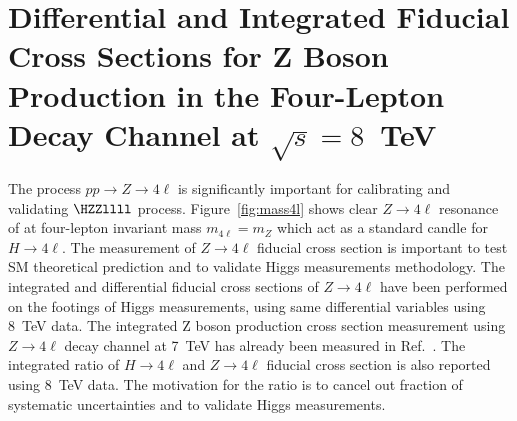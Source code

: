 \chapter{Differential and Integrated Fiducial Cross Sections for Z Boson Production in the Four-Lepton Decay Channel at $\sqrt{s} = 8$~TeV} \label{Chapter5} 
 The process $pp \rightarrow Z \rightarrow 4\ell$ is significantly important for calibrating and validating $\HZZllll$ process. 
 Figure~\ref{fig:mass4l} shows clear $Z \rightarrow 4\ell$ resonance of at four-lepton invariant mass $m_{4\ell} = m_Z$ which act as a standard
 candle for $H \rightarrow 4\ell$. The measurement of $Z \rightarrow 4\ell$ fiducial cross section is important to test SM theoretical prediction
 and to validate Higgs measurements methodology. The integrated and differential fiducial cross sections of $Z \rightarrow 4\ell$ have been performed 
 on the footings of Higgs measurements, using same differential variables using  8~TeV  data. The integrated
 Z boson production cross section measurement using $Z \rightarrow 4\ell$ decay channel at 7~TeV has already been measured in Ref.~\cite{Z4LPaper}.
 The integrated ratio of $H\rightarrow4\ell$ and $Z\rightarrow4\ell$ fiducial cross section is also reported using 8~TeV data. 
 The motivation for the ratio is to cancel out fraction of  systematic uncertainties and to validate Higgs measurements. 
